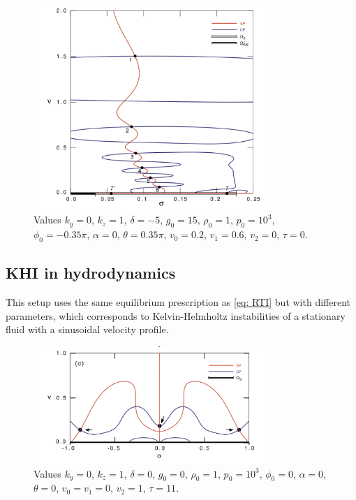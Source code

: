 \documentclass[12pt]{article}
\begin{document}
\begin{figure}[h]
	\centering
	\includegraphics[width=0.8\textwidth]{RTI_book.png}
	\caption{Values $k_y = 0$, $k_z = 1$, $\delta = -5$, $g_0 = 15$, $\rho_0 = 1$, $p_0 = 10^3$, $\phi_0 = -0.35\pi$, $\alpha = 0$, $\theta = 0.35\pi$, $v_0 = 0.2$, $v_1 = 0.6$, $v_2 = 0$, $\tau = 0$.}
\end{figure}

\newpage
\subsection{KHI in hydrodynamics}
This setup uses the same equilibrium prescription as \eqref{eq: RTI} but with different parameters, which corresponds to Kelvin-Helmholtz instabilities of a stationary fluid with a sinusoidal velocity profile.

\begin{figure}[h]
	\centering
	\includegraphics[width=0.8\textwidth]{KHI_book.png}
	\caption{Values $k_y = 0$, $k_z = 1$, $\delta = 0$, $g_0 = 0$, $\rho_0 = 1$, $p_0 = 10^3$, $\phi_0 = 0$, $\alpha = 0$, $\theta = 0$, $v_0 = v_1 = 0$, $v_2 = 1$, $\tau = 11$.}
\end{figure}



\end{document}
